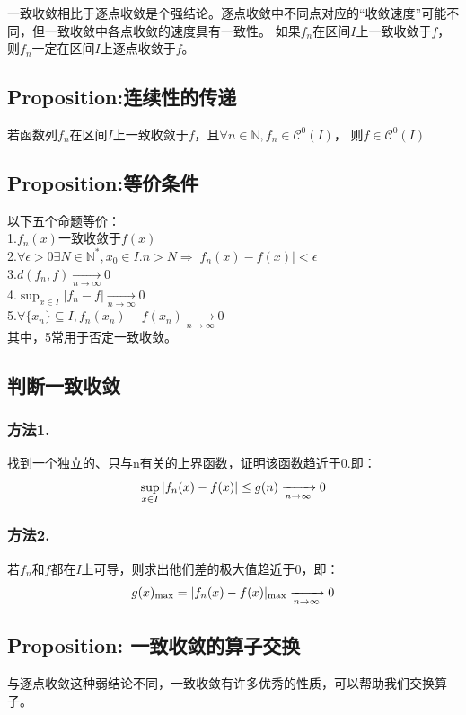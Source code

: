 \documentclass[12pt, a4paper, oneside]{ctexbook}
\begin{document}
  一致收敛相比于逐点收敛是个强结论。逐点收敛中不同点对应的“收敛速度”可能不同，但一致收敛中各点收敛的速度具有一致性。
  如果$f_n$在区间$I$上一致收敛于$f$，则$f_n$一定在区间$I$上逐点收敛于$f$。
  \subsection{Proposition:连续性的传递}
  若函数列$f_n$在区间$I$上一致收敛于$f$，且$\forall n\in\mathbb{N}, f_n\in\mathcal{C} ^0(I)$，
  则$f\in\mathcal{C} ^0(I)$
  \subsection{Proposition:等价条件}
  \noindent
  以下五个命题等价：\\
  1.$f_n(x)$一致收敛于$f(x)$\\
  2.$\forall \epsilon>0 \exists N\in \mathbb{N}^*, x_0\in I. n>N\Rightarrow | f_n(x)-f(x) |<\epsilon$ \\
  3.$d(f_n,f)\xrightarrow[n\rightarrow\infty]{}0$\\
  4.$\sup_{x\in I}| f_n-f|\xrightarrow[n\rightarrow\infty]{}0$\\
  5.$\forall \{x_n\}\subseteq I,f_n(x_n)-f(x_n)\xrightarrow[n\rightarrow\infty]{}0 $\\
  其中，5常用于否定一致收敛。
  \subsection{判断一致收敛}
  \subsubsection{方法1.}
  找到一个独立的、只与n有关的上界函数，证明该函数趋近于0.即：
  \begin{equation}
    \notag
    \sup_{x\in I}| f_n(x)-f(x)|\leq g(n)\xrightarrow[n\rightarrow\infty]{}0   
  \end{equation}
  \subsubsection{方法2.}
  若$f_n$和$f$都在$I$上可导，则求出他们差的极大值趋近于0，即：
  \begin{equation}
    \notag
    g(x)_{\max}=|f_n(x)-f(x)|_{\max}\xrightarrow[n\rightarrow\infty]{}0   
  \end{equation}
  \subsection{Proposition: 一致收敛的算子交换}
  与逐点收敛这种弱结论不同，一致收敛有许多优秀的性质，可以帮助我们交换算子。
\end{document}
